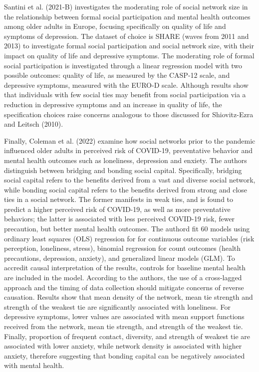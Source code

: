     Santini et al. (2021-B) investigates the moderating role of social network size in the relationship between formal social participation and mental health outcomes among older adults in Europe, focusing specifically on quality of life and symptoms of depression. The dataset of choice is SHARE (waves from 2011 and 2013) to investigate formal social participation and social network size, with their impact on quality of life and depressive symptoms. The moderating role of formal social participation is investigated through a linear regression model with two possible outcomes: quality of life, as measured by the CASP-12 scale, and depressive symptoms, measured with the EURO-D scale. Although results show that individuals with few social ties may benefit from social participation via a reduction in depressive symptoms and an increase in quality of life, the specification choices raise concerns analogous to those discussed for Shiovitz-Ezra and Leitsch (2010).

    Finally, Coleman et al. (2022) examine how social networks prior to the pandemic influenced older adults in perceived risk of COVID-19, preventative behavior and mental health outcomes such as loneliness, depression and enxiety. The authors distinguish between bridging and bonding social capital. Specifically, bridging social capital refers to the benefits derived from a vast and diverse social network, while bonding social capital refers to the benefits derived from strong and close ties in a social network. The former manifests in weak ties, and is found to predict a higher perceived risk of COVID-19, as well as more preventative behaviors; the latter is associated with less perceived COVID-19 risk, fewer precaution, but better mental health outcomes. The authord fit 60 models using ordinary least squares (OLS) regression for for continuous outcome variables (risk perception, loneliness, stress), binomial regression for count outcomes (health precautions, depression, anxiety), and generalized linear models (GLM). To accredit causal interpretation of the results, controls for baseline mental health are included in the model. According to the authors, the use of a cross-lagged approach and the timing of data collection should mitigate concerns of reverse causation.
    Results show that mean density of the network, mean tie strength and strength of the weakest tie are significantly associated with loneliness. For depressive symptoms, lower values are associated with mean support functions received from the network, mean tie strength, and strength of the weakest tie. Finally, proportion of frequent contact, diversity, and strength of weakest tie are associated with lower anxiety, while network density is associated with higher anxiety, therefore suggesting that bonding capital can be negatively associated with mental health. 

